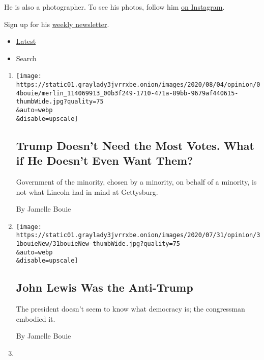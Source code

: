 He is also a photographer. To see his photos, follow him
\href{https://www.instagram.com/jbouie/?hl=en}{on Instagram}.

Sign up for his
\href{https://www.nytimes3xbfgragh.onion/newsletters/jamellebouie}{weekly
newsletter}.

\begin{itemize}
\tightlist
\item
  \protect\hyperlink{stream-panel}{Latest}
\item
  Search
\end{itemize}

\begin{enumerate}
\def\labelenumi{\arabic{enumi}.}
\item
  \href{/2020/08/04/opinion/trump-2020-electoral-college.html}{}

  \texttt{[image: https://static01.graylady3jvrrxbe.onion/images/2020/08/04/opinion/04bouie/merlin\_114069913\_00b3f249-1710-471a-89bb-9679af440615-thumbWide.jpg?quality=75\\\&auto=webp\\\&disable=upscale]}

  \hypertarget{trump-doesnt-need-the-most-votes-what-if-he-doesnt-even-want-them}{%
  \subsection{Trump Doesn't Need the Most Votes. What if He Doesn't Even
  Want
  Them?}\label{trump-doesnt-need-the-most-votes-what-if-he-doesnt-even-want-them}}

  Government of the minority, chosen by a minority, on behalf of a
  minority, is not what Lincoln had in mind at Gettysburg.

  By Jamelle Bouie
\item
  \href{/2020/07/31/opinion/sunday/john-lewis-trump-election-2020.html}{}

  \texttt{[image: https://static01.graylady3jvrrxbe.onion/images/2020/07/31/opinion/31bouieNew/31bouieNew-thumbWide.jpg?quality=75\\\&auto=webp\\\&disable=upscale]}

  \hypertarget{john-lewis-was-the-anti-trump}{%
  \subsection{John Lewis Was the
  Anti-Trump}\label{john-lewis-was-the-anti-trump}}

  The president doesn't seem to know what democracy is; the congressman
  embodied it.

  By Jamelle Bouie
\item
  \href{/2020/07/24/opinion/trump-silent-majority.html}{}


\end{enumerate}
